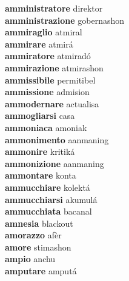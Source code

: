 \textbf{amministratore } direktor \\
\textbf{amministrazione } gobernashon \\
\textbf{ammiraglio } atmiral \\
\textbf{ammirare } atmirá \\
\textbf{ammiratore } atmiradó \\
\textbf{ammirazione } atmirashon \\
\textbf{ammissibile } permitibel \\
\textbf{ammissione } admision \\
\textbf{ammodernare } actualisa \\
\textbf{ammogliarsi } casa \\
\textbf{ammoniaca } amoniak \\
\textbf{ammonimento } aanmaning \\
\textbf{ammonire } kritiká \\
\textbf{ammonizione } aanmaning \\
\textbf{ammontare } konta \\
\textbf{ammucchiare } kolektá \\
\textbf{ammucchiarsi } akumulá \\
\textbf{ammucchiata } bacanal \\
\textbf{amnesia } blackout \\
\textbf{amorazzo } afèr \\
\textbf{amore } stimashon \\
\textbf{ampio } anchu \\
\textbf{amputare } amputá \\
